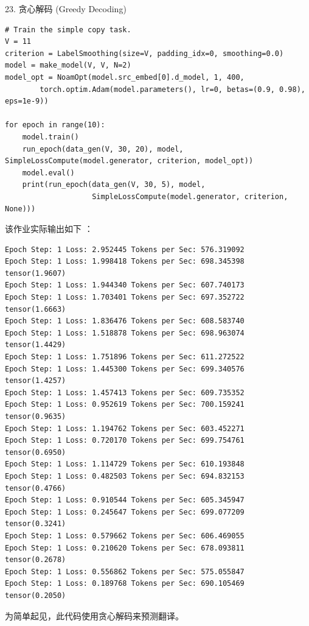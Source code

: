 23. 贪心解码 (Greedy Decoding)

\begin{Verbatim}
# Train the simple copy task.
V = 11
criterion = LabelSmoothing(size=V, padding_idx=0, smoothing=0.0)
model = make_model(V, V, N=2)
model_opt = NoamOpt(model.src_embed[0].d_model, 1, 400,
        torch.optim.Adam(model.parameters(), lr=0, betas=(0.9, 0.98), eps=1e-9))

for epoch in range(10):
    model.train()
    run_epoch(data_gen(V, 30, 20), model, SimpleLossCompute(model.generator, criterion, model_opt))
    model.eval()
    print(run_epoch(data_gen(V, 30, 5), model, 
                    SimpleLossCompute(model.generator, criterion, None)))
\end{Verbatim}

该作业实际输出如下 ：

\begin{Verbatim}
Epoch Step: 1 Loss: 2.952445 Tokens per Sec: 576.319092
Epoch Step: 1 Loss: 1.998418 Tokens per Sec: 698.345398
tensor(1.9607)
Epoch Step: 1 Loss: 1.944340 Tokens per Sec: 607.740173
Epoch Step: 1 Loss: 1.703401 Tokens per Sec: 697.352722
tensor(1.6663)
Epoch Step: 1 Loss: 1.836476 Tokens per Sec: 608.583740
Epoch Step: 1 Loss: 1.518878 Tokens per Sec: 698.963074
tensor(1.4429)
Epoch Step: 1 Loss: 1.751896 Tokens per Sec: 611.272522
Epoch Step: 1 Loss: 1.445300 Tokens per Sec: 699.340576
tensor(1.4257)
Epoch Step: 1 Loss: 1.457413 Tokens per Sec: 609.735352
Epoch Step: 1 Loss: 0.952619 Tokens per Sec: 700.159241
tensor(0.9635)
Epoch Step: 1 Loss: 1.194762 Tokens per Sec: 603.452271
Epoch Step: 1 Loss: 0.720170 Tokens per Sec: 699.754761
tensor(0.6950)
Epoch Step: 1 Loss: 1.114729 Tokens per Sec: 610.193848
Epoch Step: 1 Loss: 0.482503 Tokens per Sec: 694.832153
tensor(0.4766)
Epoch Step: 1 Loss: 0.910544 Tokens per Sec: 605.345947
Epoch Step: 1 Loss: 0.245647 Tokens per Sec: 699.077209
tensor(0.3241)
Epoch Step: 1 Loss: 0.579662 Tokens per Sec: 606.469055
Epoch Step: 1 Loss: 0.210620 Tokens per Sec: 678.093811
tensor(0.2678)
Epoch Step: 1 Loss: 0.556862 Tokens per Sec: 575.055847
Epoch Step: 1 Loss: 0.189768 Tokens per Sec: 690.105469
tensor(0.2050)
\end{Verbatim}

为简单起见，此代码使用贪心解码来预测翻译。

